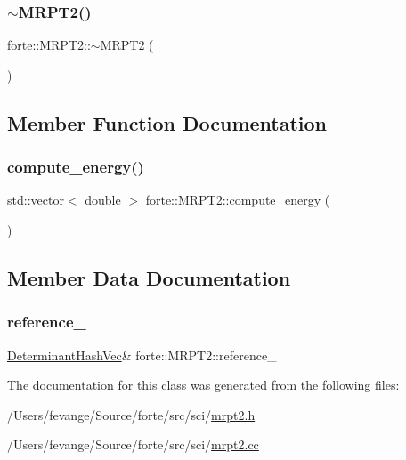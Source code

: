 \subsubsection{\texorpdfstring{$\sim$\+M\+R\+P\+T2()}{~MRPT2()}}
{\footnotesize\ttfamily forte\+::\+M\+R\+P\+T2\+::$\sim$\+M\+R\+P\+T2 (\begin{DoxyParamCaption}{ }\end{DoxyParamCaption})}



\subsection{Member Function Documentation}
\mbox{\label{classforte_1_1_m_r_p_t2_a1d8731d0e3aaf083edd2697b94dd92f3}} 
\subsubsection{\texorpdfstring{compute\+\_\+energy()}{compute\_energy()}}
{\footnotesize\ttfamily std\+::vector$<$ double $>$ forte\+::\+M\+R\+P\+T2\+::compute\+\_\+energy (\begin{DoxyParamCaption}{ }\end{DoxyParamCaption})}



\subsection{Member Data Documentation}
\mbox{\label{classforte_1_1_m_r_p_t2_a959fbe9322dc2f53d0daf9ba7ffdeac5}} 
\subsubsection{\texorpdfstring{reference\+\_\+}{reference\_}}
{\footnotesize\ttfamily \mbox{\hyperlink{classforte_1_1_determinant_hash_vec}{Determinant\+Hash\+Vec}}\& forte\+::\+M\+R\+P\+T2\+::reference\+\_\+}



The documentation for this class was generated from the following files\+:\begin{DoxyCompactItemize}
\item 
/\+Users/fevange/\+Source/forte/src/sci/\mbox{\hyperlink{mrpt2_8h}{mrpt2.\+h}}\item 
/\+Users/fevange/\+Source/forte/src/sci/\mbox{\hyperlink{mrpt2_8cc}{mrpt2.\+cc}}\end{DoxyCompactItemize}
